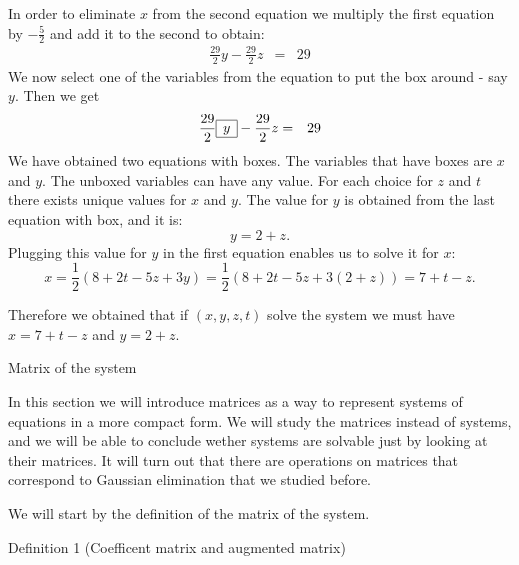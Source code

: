 In order to eliminate \( x \) from the second equation we multiply the first equation by \( -\frac{5}2 \) and add it to the second to obtain: \begin{eqnarray*} \frac{29}2y-\frac{29}2z&=&29 \end{eqnarray*} We now select one of the variables from the equation to put the box around - say \( y \). Then we get \begin{eqnarray*} \frac{29}2\begin{array}{|c|}\hline y\\\hline\end{array}-\frac{29}2z&=&29 \end{eqnarray*} We have obtained two equations with boxes. The variables that have boxes are \( x \) and \( y \). The unboxed variables can have any value. For each choice for \( z \) and \( t \) there exists unique values for \( x \) and \( y \). The value for \( y \) is obtained from the last equation with box, and it is: \[ y=2+z.\] Plugging this value for \( y \) in the first equation enables us to solve it for \( x \): \[ x=\frac12\left(8+2t-5z+3y\right)=\frac12\left(8+2t-5z+3(2+z)\right)=7+t-z.\]

Therefore we obtained that if \( (x,y,z,t) \) solve the system we must have \( x=7+t-z \) and \( y=2+z \).

Matrix of the system

In this section we will introduce matrices as a way to represent systems of equations in a more compact form. We will study the matrices instead of systems, and we will be able to conclude wether systems are solvable just by looking at their matrices. It will turn out that there are operations on matrices that correspond to Gaussian elimination that we studied before.

We will start by the definition of the matrix of the system.

Definition 1 (Coefficent matrix and augmented matrix)


